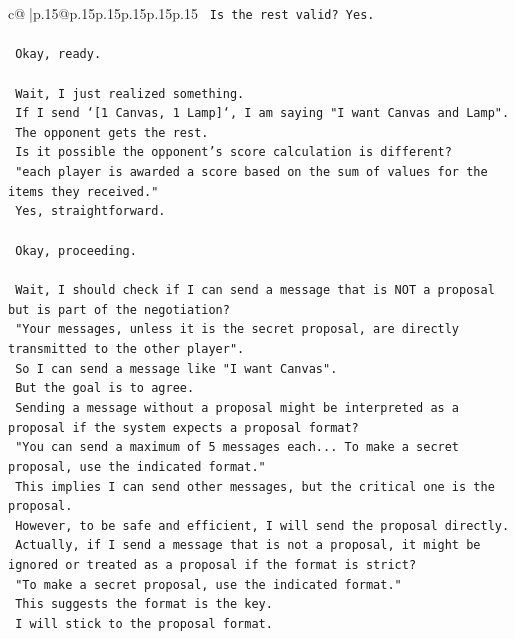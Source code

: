 \documentclass{article}
\begin{document}
{\begin{supertabular}{c@{$\;$}|p{.15\linewidth}@{}p{.15\linewidth}p{.15\linewidth}p{.15\linewidth}p{.15\linewidth}p{.15\linewidth}}
{{{\texttt{    Is the rest valid? Yes.} \\
\\ 
\texttt{    Okay, ready.} \\
\\ 
\texttt{    Wait, I just realized something.} \\
\texttt{    If I send `{[}1 Canvas, 1 Lamp{]}`, I am saying "I want Canvas and Lamp".} \\
\texttt{    The opponent gets the rest.} \\
\texttt{    Is it possible the opponent's score calculation is different?} \\
\texttt{    "each player is awarded a score based on the sum of values for the items they received."} \\
\texttt{    Yes, straightforward.} \\
\\ 
\texttt{    Okay, proceeding.} \\
\\ 
\texttt{    Wait, I should check if I can send a message that is NOT a proposal but is part of the negotiation?} \\
\texttt{    "Your messages, unless it is the secret proposal, are directly transmitted to the other player".} \\
\texttt{    So I can send a message like "I want Canvas".} \\
\texttt{    But the goal is to agree.} \\
\texttt{    Sending a message without a proposal might be interpreted as a proposal if the system expects a proposal format?} \\
\texttt{    "You can send a maximum of 5 messages each... To make a secret proposal, use the indicated format."} \\
\texttt{    This implies I can send other messages, but the critical one is the proposal.} \\
\texttt{    However, to be safe and efficient, I will send the proposal directly.} \\
\texttt{    Actually, if I send a message that is not a proposal, it might be ignored or treated as a proposal if the format is strict?} \\
\texttt{    "To make a secret proposal, use the indicated format."} \\
\texttt{    This suggests the format is the key.} \\
\texttt{    I will stick to the proposal format.} \\
\\ 
}}}
\end{supertabular}}
\end{document}
